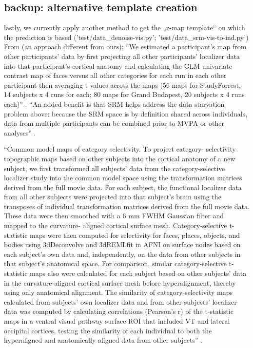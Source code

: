 \subsection{backup: alternative template creation}
%
lastly, we currently apply another method to get the „z-map template“ on which
the prediction is based ('test/data\_denoise-vis.py';
'test/data\_srm-vis-to-ind.py')
%
From \citep{jiahui2020predicting} (an approach different from ours): ``We
estimated a participant's map from other participants' data by first projecting
all other participants' localizer data into that participant's cortical anatomy
and calculating the GLM univariate contrast map of faces versus all other
categories for each run in each other participant then averaging t-values across
the maps (56 maps for StudyForrest, 14 subjects x 4 runs for each; 80 maps for
Grand Budapest, 20 subjects x 4 runs each)'' \citep{jiahui2020predicting}.
%
``An added benefit is that SRM helps address the data starvation problem above:
because the SRM space is by definition shared across individuals, data from
multiple participants can be combined prior to MVPA or other analyses''
\citep{cohen2017computational}.

``Common model maps of category selectivity. To project category- selectivity
topographic maps based on other subjects into the cortical anatomy of a new
subject, we first transformed all subjects' data from the category-selective
localizer study into the common model space using the transformation matrices
derived from the full movie data. For each subject, the functional localizer
data from all other subjects were projected into that subject’s brain using the
transposes of individual transformation matrices derived from the full movie
data. These data were then smoothed with a 6 mm FWHM Gaussian filter and mapped
to the curvature- aligned cortical surface mesh. Category-selective t-statistic
maps were then computed for selectivity for faces, places, objects, and bodies
using 3dDeconvolve and 3dREMLﬁt in AFNI on surface nodes based on each subject’s
own data and, independently, on the data from other subjects in that subject’s
anatomical space. For comparison, similar category-selective t-statistic maps
also were calculated for each subject based on other subjects' data in the
curvature-aligned cortical surface mesh before hyperalignment, thereby using
only anatomical alignment. The similarity of category-selectivity maps
calculated from subjects’ own localizer data and from other subjects’ localizer
data was computed by calculating correlations (Pearson’s r) of the t-statistic
maps in a ventral visual pathway surface ROI that included VT and lateral
occipital cortices, testing the similarity of each individual to both the
hyperaligned and anatomically aligned data from other subjects''
\citep{guntupalli2016model}.

